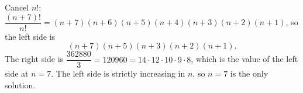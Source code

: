 Cancel $n!$: $\dfrac{(n+7)!}{n!}=(n+7)(n+6)(n+5)(n+4)(n+3)(n+2)(n+1)$, so the left side is
\[
(n+7)(n+5)(n+3)(n+2)(n+1).
\]
The right side is $\dfrac{362880}{3}=120960=14\cdot12\cdot10\cdot9\cdot8$, which is the value of the left side at $n=7$. The left side is strictly increasing in $n$, so $n=\boxed{7}$ is the only solution.
